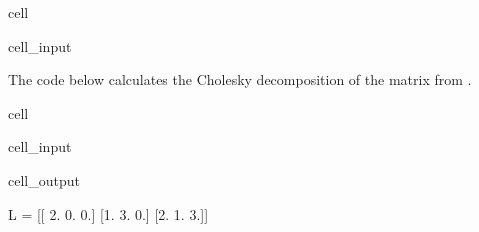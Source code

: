 \documentclass[letterpaper,10pt,english]{jupyterBook}
\begin{document}
\begin{sphinxuseclass}{cell}
\begin{sphinxVerbatimInput}
\begin{sphinxuseclass}{cell_input}
\begin{sphinxVerbatim}[commandchars=\\\{\}]
     
\end{sphinxVerbatim}

\end{sphinxuseclass}\end{sphinxVerbatimInput}

\end{sphinxuseclass}
\sphinxAtStartPar
The code below calculates the Cholesky decomposition of the matrix from {\hyperref[\detokenize{6_Direct_methods/6.3_Cholesky_decomposition:cholesky-example}]{}}.

\begin{sphinxuseclass}{cell}\begin{sphinxVerbatimInput}

\begin{sphinxuseclass}{cell_input}
\begin{sphinxVerbatim}[commandchars=\\\{\}]
  \PYG{p}{[}\PYG{p}{[}  \PYG{p}{]} \PYG{p}{[}  \PYG{p}{]} \PYG{p}{[}  \PYG{p}{]}\PYG{p}{]}

  

\end{sphinxVerbatim}

\end{sphinxuseclass}\end{sphinxVerbatimInput}
\begin{sphinxVerbatimOutput}

\begin{sphinxuseclass}{cell_output}
\begin{sphinxVerbatim}[commandchars=\\\{\}]
L = 
[[ 2.  0.  0.]
 [\PYGZhy{}1.  3.  0.]
 [\PYGZhy{}2.  1.  3.]]
\end{sphinxVerbatim}

\end{sphinxuseclass}\end{sphinxVerbatimOutput}

\end{sphinxuseclass}
\end{document}

